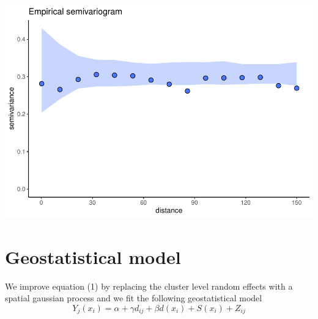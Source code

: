 \documentclass[11pt,]{article}
\newenvironment{Shaded}{\begin{snugshade}}{\end{snugshade}}
\newcommand{\DataTypeTok}[1]{\textcolor[rgb]{0.13,0.29,0.53}{#1}}
\newcommand{\DecValTok}[1]{\textcolor[rgb]{0.00,0.00,0.81}{#1}}
\newcommand{\FloatTok}[1]{\textcolor[rgb]{0.00,0.00,0.81}{#1}}
\newcommand{\KeywordTok}[1]{\textcolor[rgb]{0.13,0.29,0.53}{\textbf{#1}}}
\newcommand{\NormalTok}[1]{#1}
\newcommand{\OperatorTok}[1]{\textcolor[rgb]{0.81,0.36,0.00}{\textbf{#1}}}
\newcommand{\StringTok}[1]{\textcolor[rgb]{0.31,0.60,0.02}{#1}}
\begin{document}
\includegraphics{skeleton_files/figure-latex/mixed_model-1.pdf}

\hypertarget{geostatistical-model}{%
\section{Geostatistical model}\label{geostatistical-model}}

We improve equation (1) by replacing the cluster level random effects
with a spatial gaussian process and we fit the following geostatistical
model \begin{equation}
Y_j(x_i)=\alpha+\gamma d_{ij} + \beta d(x_i) + S(x_{i}) + Z_{ij}
\end{equation}

\begin{Shaded}
\end{Shaded}
\end{document}
